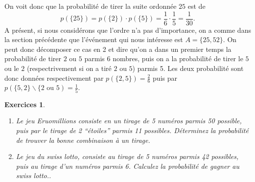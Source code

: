\documentclass[a4paper,12pt]{book}
\newtheorem*{exercices}{Exercices}
\begin{document}
On voit donc que la probabilité de tirer la suite ordonnée $25$ est de
\begin{equation}
 p(\{25\})=p(\{2\})\cdot p(\{5\})=\frac{1}{6}\cdot\frac{1}{5}=\frac{1}{30}.
\end{equation}
A présent, si nous considérons que l'ordre n'a pas d'importance, on a comme dans la section précédente
que l'événement qui nous intéresse est $A=\{25,52\}$. On peut donc décomposer 
ce cas en 2 et dire qu'on a dans un premier temps la probabilité de tirer $2$ ou $5$ parmis 
$6$ nombres, puis on a la probabilité de tirer le $5$ ou le $2$ (respectrivement si on a tiré $2$ ou $5$) parmis 5.
Les deux probabilité sont donc données respectivement par $p(\{2,5\})=\frac{2}{6}$ puis par $p(\{5,2\}\backslash \{2\mbox{ ou }5)=\frac{1}{5}$.

\begin{exercices}
\hfill\break
 \begin{enumerate}
  \item Le jeu Eruomillions consiste en un tirage de 5 numéros parmis 50 possible, puis par le tirage de 2 ``étoiles'' parmis 11 possibles.
  Déterminez la probabilité de trouver la bonne combinaison à un tirage.
  \item Le jeu du swiss lotto, consiste au tirage de 5 numéros parmis 42 possibles, puis au tirage d'un numéros parmis 6. Calculez la probabilité de 
  gagner au swiss lotto..
 \end{enumerate}
\end{exercices}
\end{document}
